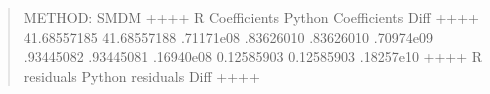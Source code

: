 \documentclass[letterpaper,10pt,english]{sphinxmanual}
\begin{document}
\begin{enumerate}
\begin{quote}
\begin{sphinxVerbatim}[commandchars=\\\{\}]
METHOD: SMDM
+\PYGZhy{}\PYGZhy{}\PYGZhy{}\PYGZhy{}\PYGZhy{}\PYGZhy{}\PYGZhy{}\PYGZhy{}\PYGZhy{}\PYGZhy{}\PYGZhy{}\PYGZhy{}\PYGZhy{}\PYGZhy{}\PYGZhy{}\PYGZhy{}+\PYGZhy{}\PYGZhy{}\PYGZhy{}\PYGZhy{}\PYGZhy{}\PYGZhy{}\PYGZhy{}\PYGZhy{}\PYGZhy{}\PYGZhy{}\PYGZhy{}\PYGZhy{}\PYGZhy{}\PYGZhy{}\PYGZhy{}\PYGZhy{}\PYGZhy{}\PYGZhy{}\PYGZhy{}\PYGZhy{}\PYGZhy{}+\PYGZhy{}\PYGZhy{}\PYGZhy{}\PYGZhy{}\PYGZhy{}\PYGZhy{}\PYGZhy{}\PYGZhy{}\PYGZhy{}\PYGZhy{}\PYGZhy{}\PYGZhy{}\PYGZhy{}+
 R Coefficients  Python Coefficients     Diff     
+\PYGZhy{}\PYGZhy{}\PYGZhy{}\PYGZhy{}\PYGZhy{}\PYGZhy{}\PYGZhy{}\PYGZhy{}\PYGZhy{}\PYGZhy{}\PYGZhy{}\PYGZhy{}\PYGZhy{}\PYGZhy{}\PYGZhy{}\PYGZhy{}+\PYGZhy{}\PYGZhy{}\PYGZhy{}\PYGZhy{}\PYGZhy{}\PYGZhy{}\PYGZhy{}\PYGZhy{}\PYGZhy{}\PYGZhy{}\PYGZhy{}\PYGZhy{}\PYGZhy{}\PYGZhy{}\PYGZhy{}\PYGZhy{}\PYGZhy{}\PYGZhy{}\PYGZhy{}\PYGZhy{}\PYGZhy{}+\PYGZhy{}\PYGZhy{}\PYGZhy{}\PYGZhy{}\PYGZhy{}\PYGZhy{}\PYGZhy{}\PYGZhy{}\PYGZhy{}\PYGZhy{}\PYGZhy{}\PYGZhy{}\PYGZhy{}+
   \PYGZhy{}41.68557185         \PYGZhy{}41.68557188  .71171e\PYGZhy{}08 
     .83626010           .83626010  .70974e\PYGZhy{}09 
     .93445082           .93445081  .16940e\PYGZhy{}08 
    \PYGZhy{}0.12585903          \PYGZhy{}0.12585903  .18257e\PYGZhy{}10 
+\PYGZhy{}\PYGZhy{}\PYGZhy{}\PYGZhy{}\PYGZhy{}\PYGZhy{}\PYGZhy{}\PYGZhy{}\PYGZhy{}\PYGZhy{}\PYGZhy{}\PYGZhy{}\PYGZhy{}\PYGZhy{}\PYGZhy{}\PYGZhy{}+\PYGZhy{}\PYGZhy{}\PYGZhy{}\PYGZhy{}\PYGZhy{}\PYGZhy{}\PYGZhy{}\PYGZhy{}\PYGZhy{}\PYGZhy{}\PYGZhy{}\PYGZhy{}\PYGZhy{}\PYGZhy{}\PYGZhy{}\PYGZhy{}\PYGZhy{}\PYGZhy{}\PYGZhy{}\PYGZhy{}\PYGZhy{}+\PYGZhy{}\PYGZhy{}\PYGZhy{}\PYGZhy{}\PYGZhy{}\PYGZhy{}\PYGZhy{}\PYGZhy{}\PYGZhy{}\PYGZhy{}\PYGZhy{}\PYGZhy{}\PYGZhy{}+
  R residuals     Python residuals       Diff     
+\PYGZhy{}\PYGZhy{}\PYGZhy{}\PYGZhy{}\PYGZhy{}\PYGZhy{}\PYGZhy{}\PYGZhy{}\PYGZhy{}\PYGZhy{}\PYGZhy{}\PYGZhy{}\PYGZhy{}\PYGZhy{}\PYGZhy{}\PYGZhy{}+\PYGZhy{}\PYGZhy{}\PYGZhy{}\PYGZhy{}\PYGZhy{}\PYGZhy{}\PYGZhy{}\PYGZhy{}\PYGZhy{}\PYGZhy{}\PYGZhy{}\PYGZhy{}\PYGZhy{}\PYGZhy{}\PYGZhy{}\PYGZhy{}\PYGZhy{}\PYGZhy{}\PYGZhy{}\PYGZhy{}\PYGZhy{}+\PYGZhy{}\PYGZhy{}\PYGZhy{}\PYGZhy{}\PYGZhy{}\PYGZhy{}\PYGZhy{}\PYGZhy{}\PYGZhy{}\PYGZhy{}\PYGZhy{}\PYGZhy{}\PYGZhy{}+

\end{sphinxVerbatim}
\end{quote}
\end{enumerate}
\end{document}
